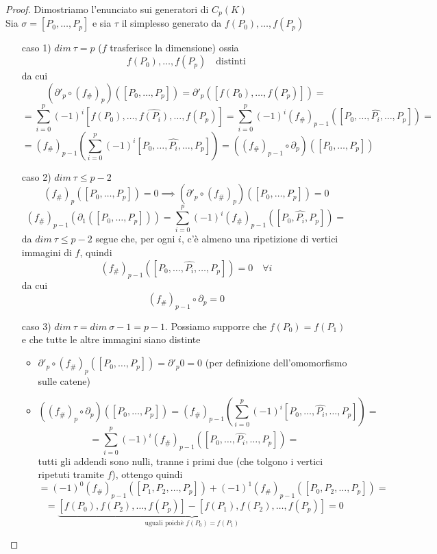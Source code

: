 \documentclass[a4paper]{report}
\newcommand{\shrp}[1]{\ensuremath{({#1}_\#)_p}}
\begin{document}
\begin{proof}
    Dimostriamo l'enunciato sui generatori di $C_p(K)$\\
    Sia $\sigma=[P_0,\dots,P_p]$ e sia $\tau$ il simplesso generato da $f(P_0),\dots,f(P_p)$\\
    \begin{enumerate}
        \item[caso 1)] $dim\ \tau=p$ ($f$ trasferisce la dimensione) ossia
            \[
                f(P_0),\dots,f(P_p)\quad\text{distinti}
            \]
            da cui
            \[
                \left(\partial'_p\circ\shrp{f}\right)([P_0,\dots,P_p])=\partial'_p([f(P_0),\dots,f(P_p)])=
            \]
            \[
                =\sum_{i=0}^p(-1)^i[f(P_0),\dots,\hat{f(P_i)},\dots,f(P_p)]=\sum_{i=0}^p(-1)^i(f_\#)_{p-1}([P_0,\dots,\hat{P_i},\dots,P_p])=
            \]
            \[
                =(f_\#)_{p-1}\left(\sum_{i=0}^p(-1)^i[P_0,\dots,\hat{P_i},\dots,P_p]\right)=\left((f_\#)_{p-1}\circ\partial_p\right)([P_0,\dots,P_p])
            \]
        \item[caso 2)] $dim\ \tau\leq p-2$
            \[
                \shrp{f}([P_0,\dots,P_p])=0\implies\left(\partial'_p\circ\shrp{f}\right)([P_0,\dots,P_p])=0
            \]
            \[
                (f_\#)_{p-1}(\partial_1([P_0,\dots,P_p]))=\sum_{i=0}^p(-1)^i(f_\#)_{p-1}([P_0,\hat{P_i},P_p])=
            \]
            da $dim\ \tau\leq p-2$ segue che, per ogni $i$, c'è almeno una ripetizione di vertici immagini di $f$, quindi
            \[
                (f_\#)_{p-1}([P_0,\dots,\hat{P_i},\dots,P_p])=0\quad\forall i
            \]
            da cui
            \[
                (f_\#)_{p-1}\circ\partial_p=0
            \]
        \item[caso 3)] $dim\ \tau=dim\ \sigma-1=p-1$. Possiamo supporre che $f(P_0)=f(P_1)$ e che tutte le altre immagini siano distinte
            \begin{itemize}
                \item $\partial'_p\circ\shrp{f}([P_0,\dots,P_p])=\partial'_p 0=0$ (per definizione dell'omomorfismo sulle catene)
                \item \[
                          \left(\shrp{f}\circ\partial_p\right)([P_0,\dots,P_p])=(f_\#)_{p-1}\left(\sum_{i=0}^p(-1)^i[P_0,\dots,\hat{P_i},\dots,P_p]\right)=
                      \]
                      \[
                          =\sum_{i=0}^p(-1)^i(f_\#)_{p-1}([P_0,\dots,\hat{P_i},\dots,P_p])=
                      \]
                      tutti gli addendi sono nulli, tranne i primi due (che tolgono i vertici ripetuti tramite $f$), ottengo quindi
                      \[
                          =(-1)^0(f_\#)_{p-1}([P_1,P_2,\dots,P_p])+(-1)^1(f_\#)_{p-1}([P_0,P_2,\dots,P_p])=
                      \]
                      \[
                          =\underbrace{[f(P_0),f(P_2),\dots,f(P_p)]-[f(P_1),f(P_2),\dots,f(P_p)]}_{\text{uguali poichè }f(P_0)=f(P_1)}=0
                      \]
            \end{itemize}
    \end{enumerate}
\end{proof}
\end{document}
